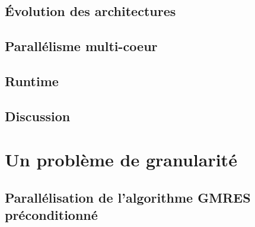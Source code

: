 \documentclass[twoside,11pt]{classes/Thesis}
\begin{document}
\section{\'Evolution des architectures}





%



\section{Parallélisme multi-coeur}






\section{Runtime}





\section{Discussion}



\chapter{Un problème de granularité}
\minitoc
\vspace{1cm}


\section{Parallélisation de l'algorithme GMRES préconditionné}


\end{document}
